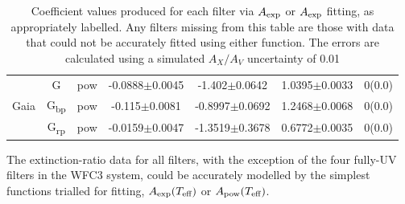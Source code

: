 \documentclass[12pt, a4paper]{report}
\begin{document}
\begin{table}
\begin{center}
\begin{tabular}{ccccccc}
& G & pow & -0.0888$\pm$0.0045 & -1.402$\pm$0.0642 & 1.0395$\pm$0.0033 & 0(0.0) \\
Gaia & G\textsubscript{bp} & pow & -0.115$\pm$0.0081 & -0.8997$\pm$0.0692 & 1.2468$\pm$0.0068 & 0(0.0) \\
& G\textsubscript{rp} & pow & -0.0159$\pm$0.0047 & -1.3519$\pm$0.3678 & 0.6772$\pm$0.0035 & 0(0.0) \\ \hline

\end{tabular}
\caption{Coefficient values produced for each filter via $A_{\textnormal{exp}}$ or $A_{\textnormal{exp}}$ fitting, as appropriately labelled. Any filters missing from this table are those with data that could not be accurately fitted using either function. The errors are calculated using a simulated $A_{X}/A_{V}$ uncertainty of 0.01}
\label{simpfunc_coeffs_table}
\end{center}
\end{table}

The extinction-ratio data for all filters, with the exception of the four fully-UV filters in the WFC3 system, could be accurately modelled by the simplest functions trialled for fitting, $A_{\textnormal{exp}} (T_{\textnormal{eff}})$ or $A_{\textnormal{pow}} (T_{\textnormal{eff}})$.
\end{document}
